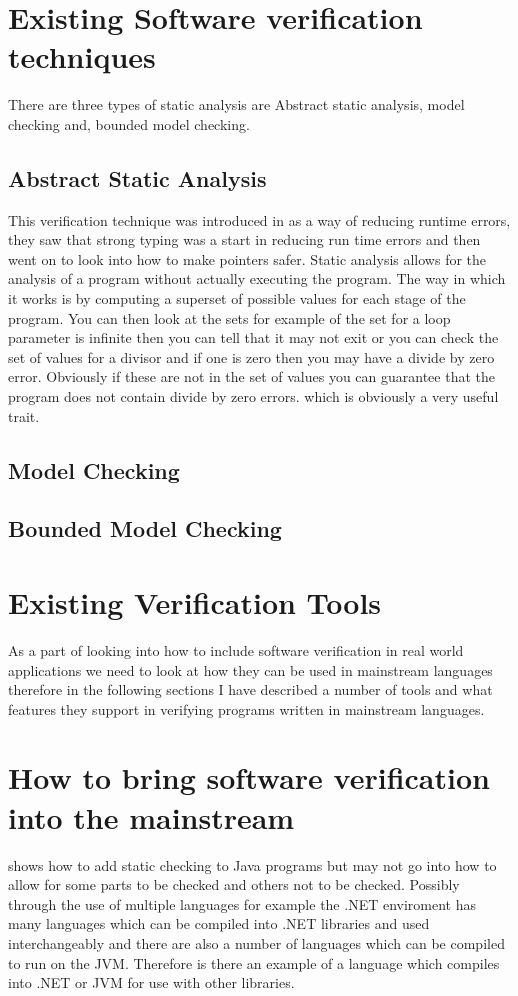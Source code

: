 \documentclass[a4paper,12pt]{scrartcl}
\begin{document}
	\section{Existing Software verification techniques}
	{
		There are three types of static analysis are Abstract static analysis, model checking and, bounded model checking.\cite{DSilva2008} 
		\subsection{Abstract Static Analysis}
		{
			This verification technique was introduced in \cite{Cousot1977} as a way of reducing runtime errors, they saw that strong typing was a start in reducing run time errors and then went on to look into how to make pointers safer. Static analysis allows for the analysis of a program without actually executing the program. The way in which it works is by computing a superset of possible values for each stage of the program. You can then look at the sets for example of the set for a loop parameter is infinite then you can tell that it may not exit or you can check the set of values for a divisor and if one is zero then you may have a divide by zero error. Obviously if these are not in the set of values you can guarantee that the program does not contain divide by zero errors. which is obviously a very useful trait.
		}
		\subsection{Model Checking}
		{
		
		}
		\subsection{Bounded Model Checking}
	}
	
	\section{Existing Verification Tools}
	{
		As a part of looking into how to include software verification in real world applications we need to look at how they can be used in mainstream languages therefore in the following sections I have described a number of tools and what features they support in verifying programs written in mainstream languages.
	}

	\section{How to bring software verification into the mainstream}
	{
		\cite{Flanagan2002} shows how to add static checking to Java programs but may not go into how to allow for some parts to be checked and others not to be checked. Possibly through the use of multiple languages for example the .NET enviroment has many languages which can be compiled into .NET libraries and used interchangeably and there are also a number of languages which can be compiled to run on the JVM. Therefore is there an example of a language which compiles into .NET or JVM for use with other libraries.
	}
	
\end{document}
